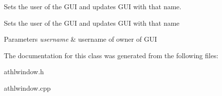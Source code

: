 Sets the user of the G\+UI and updates G\+UI with that name. 

Sets the user of the G\+UI and updates G\+UI with that name 
\begin{DoxyParams}{Parameters}
{\em username} & username of owner of G\+UI \\
\hline
\end{DoxyParams}


The documentation for this class was generated from the following files\+:\begin{DoxyCompactItemize}
\item 
athlwindow.\+h\item 
athlwindow.\+cpp\end{DoxyCompactItemize}
